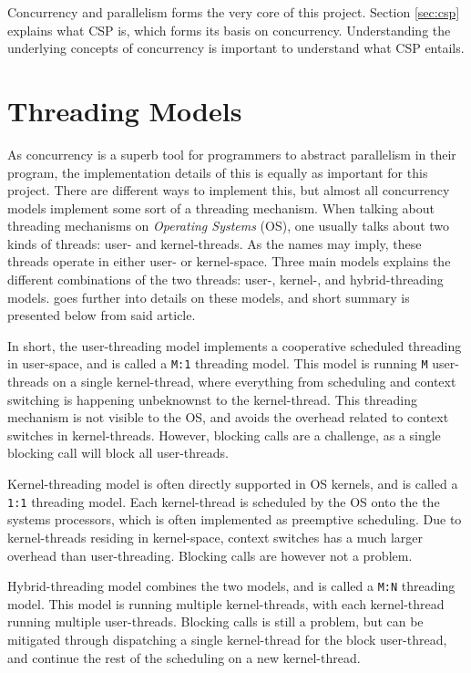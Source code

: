Concurrency and parallelism forms the very core of this project. Section \ref{sec:csp} explains what CSP is, which forms its basis on concurrency. Understanding the underlying concepts of concurrency is important to understand what CSP entails.


\section{Threading Models}
\label{sec:threading_models}

As concurrency is a superb tool for programmers to abstract parallelism in their program, the implementation details of this is equally as important for this project. There are different ways to implement this, but almost all concurrency models implement some sort of a threading mechanism. When talking about threading mechanisms on \textit{Operating Systems} (OS), one usually talks about two kinds of threads: user- and kernel-threads. As the names may imply, these threads operate in either user- or kernel-space. Three main models explains the different combinations of the two threads: user-, kernel-, and hybrid-threading models. \citet{c++csp2} goes further into details on these models, and short summary is presented below from said article.

In short, the user\hyp{}threading model implements a cooperative scheduled threading in user\hyp{}space, and is called a \texttt{M:1} threading model. This model is running \texttt{M} user-threads on a single kernel\hyp{}thread, where everything from scheduling and context switching is happening unbeknownst to the kernel\hyp{}thread. This threading mechanism is not visible to the OS, and avoids the overhead related to context switches in kernel-threads. However, blocking calls are a challenge, as a single blocking call will block all user-threads.

Kernel\hyp{}threading model is often directly supported in OS kernels, and is called a \texttt{1:1} threading model. Each kernel\hyp{}thread is scheduled by the OS onto the the systems processors, which is often implemented as preemptive scheduling. Due to kernel\hyp{}threads residing in kernel\hyp{}space, context switches has a much larger overhead than user\hyp{}threading. Blocking calls are however not a problem. 

Hybrid-threading model combines the two models, and is called a \texttt{M:N} threading model. This model is running multiple kernel\hyp{}threads, with each kernel-thread running multiple user\hyp{}threads. Blocking calls is still a problem, but can be mitigated through dispatching a single kernel\hyp{}thread for the block user\hyp{}thread, and continue the rest of the scheduling on a new kernel\hyp{}thread. 


